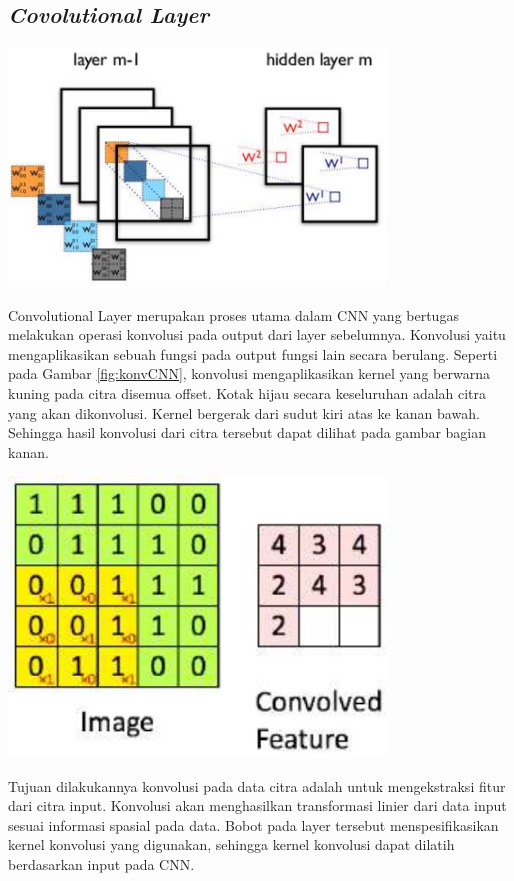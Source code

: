 \subsection{\textit{Covolutional Layer}}
\begin{center}
	\includegraphics[width=0.75\textwidth]{gambar/konvoCNN.png}
	\citep{Wayan_Suartika_undated-rv}
	\label{fig:konvCNN}
\end{center}
Convolutional Layer merupakan proses utama dalam CNN yang
bertugas melakukan operasi konvolusi pada output dari layer sebelumnya. Konvolusi yaitu mengaplikasikan sebuah fungsi pada output fungsi lain secara berulang. Seperti pada Gambar \ref{fig:konvCNN}, konvolusi
mengaplikasikan kernel yang berwarna kuning pada citra disemua
offset. Kotak hijau secara keseluruhan adalah citra yang akan dikonvolusi. Kernel bergerak dari sudut kiri atas ke kanan bawah.
Sehingga hasil konvolusi dari citra tersebut dapat dilihat pada gambar bagian kanan.

\begin{center}
	\includegraphics[width=0.75\textwidth]{gambar/ilusKonvo.png}
	\citep{Wayan_Suartika_undated-rv}
	\label{fig:prosKonv}
\end{center}
Tujuan dilakukannya konvolusi pada data citra adalah untuk mengekstraksi fitur dari citra input. Konvolusi akan
menghasilkan transformasi linier dari data input sesuai informasi
spasial pada data. Bobot pada layer tersebut menspesifikasikan
kernel konvolusi yang digunakan, sehingga kernel konvolusi dapat
dilatih berdasarkan input pada CNN.

